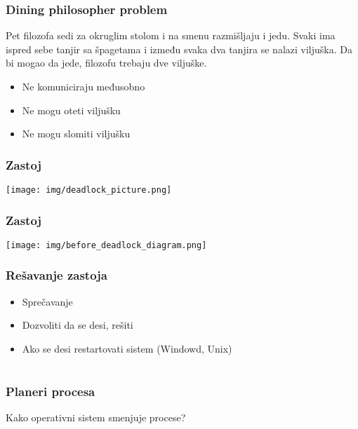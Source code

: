 \documentclass{beamer}
\begin{document}
\begin{frame}
    \frametitle{Dining philosopher problem}

    Pet filozofa sedi za okruglim stolom i na smenu razmišljaju i jedu. Svaki ima ispred sebe tanjir sa špagetama i između svaka dva tanjira se nalazi viljuška. Da bi mogao da jede, filozofu trebaju dve viljuške. \newline

    \begin{itemize}
        \item Ne komuniciraju međusobno \newline
        \item Ne mogu oteti viljušku \newline
        \item Ne mogu slomiti viljušku \newline
    \end{itemize}
\end{frame}

\begin{frame}
    \frametitle{Zastoj}
    \begin{center}
        \texttt{[image: img/deadlock\_picture.png]}    
    \end{center}
\end{frame}

\begin{frame}
    \frametitle{Zastoj}
    \begin{center}
        \texttt{[image: img/before\_deadlock\_diagram.png]}
    \end{center}
\end{frame}

\begin{frame}
    \frametitle{Rešavanje zastoja}
    \begin{itemize}
        \item Sprečavanje \newline
        \item Dozvoliti da se desi, rešiti \newline
        \item Ako se desi restartovati sistem (Windowd, Unix)
    \end{itemize}
\end{frame}

\section*{}
\subsection*{}
\begin{frame}
    \frametitle{Planeri procesa}
    \begin{center}
        \LARGE{Kako operativni sistem smenjuje procese?}
    \end{center}
\end{frame}
\end{document}
